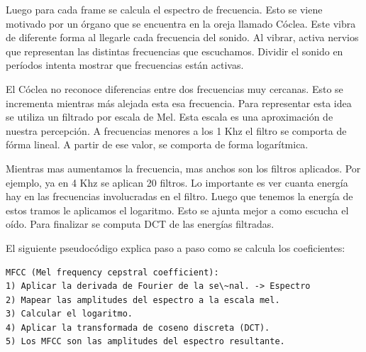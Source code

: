 \documentclass[11pt,a4paper,twoside]{tesis}
\begin{document}
Luego para cada frame se calcula el espectro de frecuencia. Esto se viene motivado por un órgano que se encuentra en la oreja llamado Cóclea. Este vibra de diferente forma al llegarle cada frecuencia del sonido. Al vibrar, activa nervios que representan las distintas frecuencias que escuchamos. Dividir el sonido en períodos intenta mostrar que frecuencias están activas.

El Cóclea no reconoce diferencias entre dos frecuencias muy cercanas. Esto se incrementa mientras más alejada esta esa frecuencia. Para representar esta idea se utiliza un filtrado por escala de Mel. Esta escala es una aproximación de nuestra percepción. A frecuencias menores a los 1 Khz el filtro se comporta de fórma lineal. A partir de ese valor, se comporta de forma logarítmica. 


Mientras mas aumentamos la frecuencia, mas anchos son los filtros aplicados. Por ejemplo, ya en 4 Khz se aplican 20 filtros. Lo importante es ver cuanta energía hay en las frecuencias involucradas en el filtro. Luego que tenemos la energía de estos tramos le aplicamos el logaritmo. Esto se ajunta mejor a como escucha el oído. Para finalizar se computa DCT de las energías filtradas. 

El siguiente pseudocódigo explica paso a paso como se calcula los coeficientes:
\begin{lstlisting}
MFCC (Mel frequency cepstral coefficient):
1) Aplicar la derivada de Fourier de la se\~nal. -> Espectro
2) Mapear las amplitudes del espectro a la escala mel.
3) Calcular el logaritmo.
4) Aplicar la transformada de coseno discreta (DCT).
5) Los MFCC son las amplitudes del espectro resultante.
\end{lstlisting}
\end{document}
